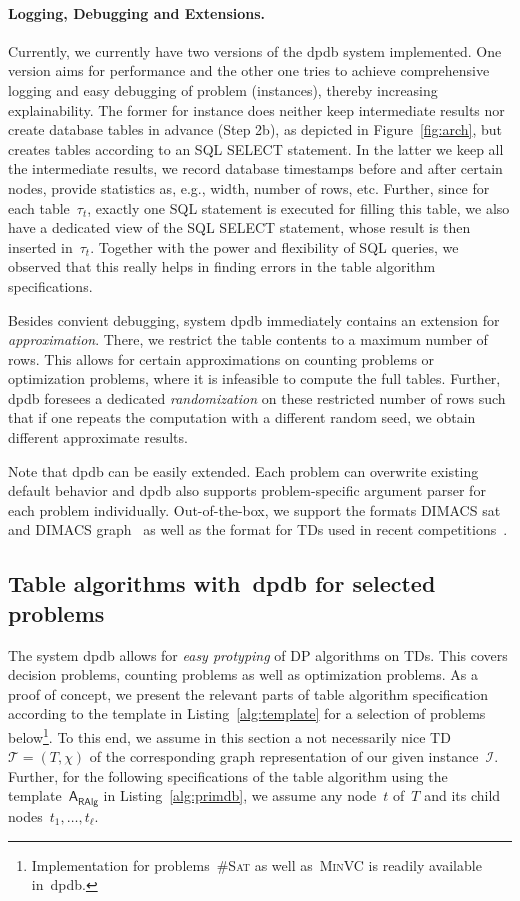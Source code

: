 \documentclass{llncs}
\newcommand{\cSAT}{\textsc{\#Sat}\xspace}%
\newcommand{\VC}{\textsc{MinVC}\xspace}%
\newcommand{\dpdb}{{\small\textsf{dpdb}}\xspace}
\newcommand{\algo}[1]{\ensuremath{\mathsf{#1}}}
\newcommand{\tab}[1]{\ensuremath{\tau_{#1}}}
\begin{document}
\paragraph*{Logging, Debugging and Extensions.} Currently, we currently have two versions of the \dpdb system implemented. 
One version aims for performance and the other one tries to achieve comprehensive logging and easy debugging of problem (instances), thereby increasing explainability.
The former for instance does neither keep intermediate results 
nor create database tables in advance (Step 2b),
as depicted in Figure~\ref{fig:arch}, but creates tables according 
to an SQL {\ttfamily SELECT} statement.
In the latter we keep all the intermediate results, we record database timestamps before and after certain nodes, provide statistics as, e.g., width, number of rows, etc.
Further, since for each table~$\tab{t}$, exactly one SQL statement is executed for filling this table, we also have a dedicated view of the SQL {\ttfamily SELECT} statement, whose result is then inserted in~$\tab{t}$.
Together with the power and flexibility of SQL queries, we observed that this really helps in finding errors in the table algorithm specifications.

Besides convient debugging, system \dpdb immediately
contains an extension for \emph{approximation}.
There, we restrict the table contents to a maximum number of rows.
This allows for certain approximations on counting problems or
optimization problems, where it is infeasible to compute the full tables.
Further, \dpdb foresees a dedicated \emph{randomization} on these restricted number of rows
such that if one repeats the computation with a different random seed,
we obtain different approximate results.

Note that \dpdb can be easily extended. 
Each problem can overwrite existing default behavior and \dpdb also supports
problem-specific argument parser for each problem individually.
Out-of-the-box, we support the formats DIMACS sat and DIMACS graph~\cite{LiuZhongJiao06} as well as the format for TDs used in recent competitions~\cite{DellHusfeldtJansen17a,DellKomusiewiczTalmon18a}.


\subsection{Table algorithms with~\dpdb for selected problems}

The system \dpdb allows for \emph{easy protyping} of DP algorithms on TDs.
This covers decision problems, counting problems as well as optimization problems.
As a proof of concept, we present the relevant parts of table algorithm specification
according to the template in Listing~\ref{alg:template} for a selection of problems below\footnote{Implementation for problems~\cSAT as well as~\VC is readily available in~\dpdb.}.
To this end, we assume in this section a not necessarily nice TD~$\mathcal{T}=(T,\chi)$ of the corresponding graph representation of our given instance~$\mathcal{I}$.
Further, for the following specifications of the table algorithm using the template~$\algo{A_{RAlg}}$ 
in Listing~\ref{alg:primdb}, we assume any node~$t$ of~$T$ and its child nodes~$t_1, \ldots, t_\ell$.
\end{document}
